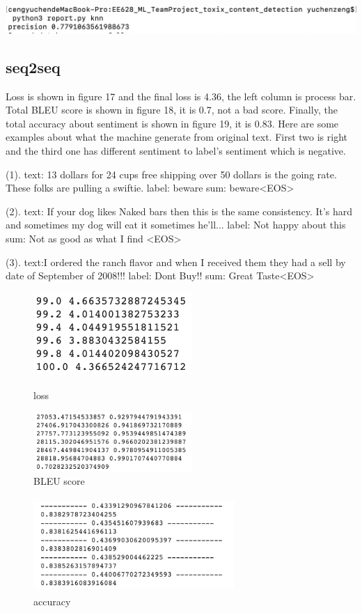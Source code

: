 \documentclass{article}
\begin{document}
\includegraphics[scale=1]{KNN.jpg}
\subsection{seq2seq}
Loss is shown in figure 17 and the final loss is 4.36, the left column is process bar. Total BLEU score is shown in figure 18, it is 0.7, not a bad score. Finally, the total accuracy about sentiment is shown in figure 19, it is 0.83. Here are some examples about what the machine generate from original text. First two is right and the third one has different sentiment to label's sentiment which is negative.

(1). text: 13 dollars for 24 cups free shipping over 50 dollars is the going rate. These folks are pulling a swiftie.
label: beware
sum: beware<EOS>

(2). text: If your dog likes Naked bars then this is the same consistency. It's hard and sometimes my dog will eat it sometimes he'll...
label: Not happy about this
sum: Not as good as what I find <EOS>

(3). text:I ordered the ranch flavor and when I received them they had a sell by date of September of 2008!!!
label: Dont Buy!!
sum: Great Taste<EOS>

\begin{figure}
\centering
\begin{minipage}[t]{0.48\textwidth}
\centering
\includegraphics[width=6cm]{loss.png}
\caption{loss}
\end{minipage}
\begin{minipage}[t]{0.48\textwidth}
\centering
\includegraphics[width=6cm]{bleu.png}
\caption{BLEU score}
\end{minipage}
\end{figure}
\begin{figure}
    \centering
    \includegraphics[width = 3.0in, height = 1.4in]{accuracy.png}
    \caption{accuracy}
    \label{fig: 9 }
\end{figure}
\end{document}
